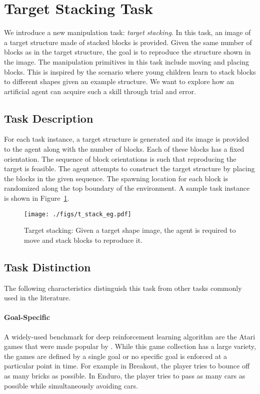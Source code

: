 \section{Target Stacking Task}
We introduce a new manipulation task: {\em target stacking\/}. In this task, an image of a target structure made of stacked blocks is provided. Given the same number of blocks as in the target structure, the goal is to reproduce the structure shown in the image. The manipulation primitives in this task include moving and placing blocks. This is inspired by the scenario where young children learn to stack blocks to different shapes given an example structure. We want to explore how an artificial agent can acquire such a skill through trial and error. 

\subsection{Task Description}
For each task instance, a target structure is generated and its image is provided to the agent along with the number of blocks. Each of these blocks has a fixed orientation. The sequence of block orientations is such that reproducing the target is feasible. The agent attempts to construct the target structure by placing the blocks in the given sequence. The spawning location for each block is randomized along the top boundary of the environment. A sample task instance is shown in Figure~\ref{fig:tstack_demo}.

\begin{figure}
\centering
\texttt{[image: ./figs/t\_stack\_eg.pdf]}
\caption{Target stacking: Given a target shape image, the agent is required to move and stack blocks to reproduce it.}
\label{fig:tstack_demo}
\end{figure}

\subsection{Task Distinction}
The following characteristics distinguish this task from other tasks commonly used in the literature.

\paragraph{Goal-Specific}
A widely-used benchmark for deep reinforcement learning algorithm are the Atari games \citep{bellemare13arcade} that were made popular by \cite{mnih2013playing}. While this game collection has a large variety, the games are defined by a single goal or no specific goal is enforced at a particular point in time. For example in Breakout, the player tries to bounce off as many bricks as possible. In Enduro, the player tries to pass as many cars as possible while simultaneously avoiding cars. 

